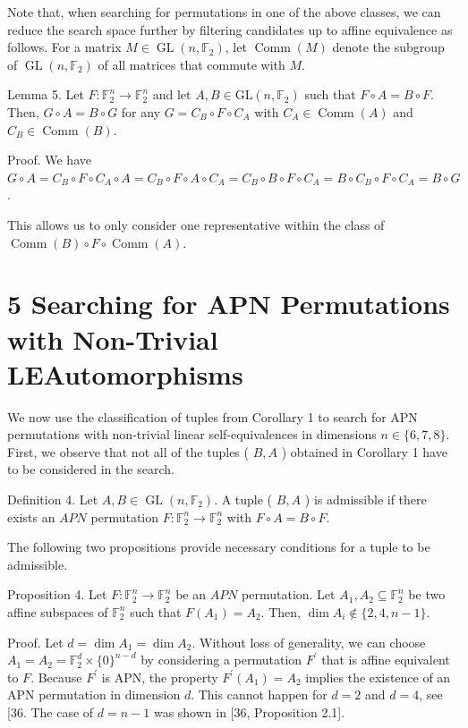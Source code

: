 \documentclass[10pt]{article}
\begin{document}
Note that, when searching for permutations in one of the above classes, we can reduce the search space further by filtering candidates up to affine equivalence as follows. For a matrix $M \in \operatorname{GL}\left(n, \mathbb{F}_{2}\right)$, let $\operatorname{Comm}(M)$ denote the subgroup of $\operatorname{GL}\left(n, \mathbb{F}_{2}\right)$ of all matrices that commute with $M$.

Lemma 5. Let $F: \mathbb{F}_{2}^{n} \rightarrow \mathbb{F}_{2}^{n}$ and let $A, B \in \mathrm{GL}\left(n, \mathbb{F}_{2}\right)$ such that $F \circ A=B \circ F$. Then, $G \circ A=B \circ G$ for any $G=C_{B} \circ F \circ C_{A}$ with $C_{A} \in \operatorname{Comm}(A)$ and $C_{B} \in \operatorname{Comm}(B)$.

Proof. We have $G \circ A=C_{B} \circ F \circ C_{A} \circ A=C_{B} \circ F \circ A \circ C_{A}=C_{B} \circ B \circ F \circ C_{A}= B \circ C_{B} \circ F \circ C_{A}=B \circ G$.

This allows us to only consider one representative within the class of $\operatorname{Comm}(B) \circ F \circ \operatorname{Comm}(A)$.

\section*{5 Searching for APN Permutations with Non-Trivial LEAutomorphisms}
We now use the classification of tuples from Corollary 1 to search for APN permutations with non-trivial linear self-equivalences in dimensions $n \in\{6,7,8\}$. First, we observe that not all of the tuples ( $B, A$ ) obtained in Corollary 1 have to be considered in the search.

Definition 4. Let $A, B \in \operatorname{GL}\left(n, \mathbb{F}_{2}\right)$. A tuple ( $B, A$ ) is admissible if there exists an $A P N$ permutation $F: \mathbb{F}_{2}^{n} \rightarrow \mathbb{F}_{2}^{n}$ with $F \circ A=B \circ F$.

The following two propositions provide necessary conditions for a tuple to be admissible.

Proposition 4. Let $F: \mathbb{F}_{2}^{n} \rightarrow \mathbb{F}_{2}^{n}$ be an $A P N$ permutation. Let $A_{1}, A_{2} \subseteq \mathbb{F}_{2}^{n}$ be two affine subspaces of $\mathbb{F}_{2}^{n}$ such that $F\left(A_{1}\right)=A_{2}$. Then, $\operatorname{dim} A_{i} \notin\{2,4, n-1\}$.

Proof. Let $d=\operatorname{dim} A_{1}=\operatorname{dim} A_{2}$. Without loss of generality, we can choose $A_{1}=A_{2}= \mathbb{F}_{2}^{d} \times\{0\}^{n-d}$ by considering a permutation $F^{\prime}$ that is affine equivalent to $F$. Because $F^{\prime}$ is APN, the property $F^{\prime}\left(A_{1}\right)=A_{2}$ implies the existence of an APN permutation in dimension $d$. This cannot happen for $d=2$ and $d=4$, see [36. The case of $d=n-1$ was shown in [36, Proposition 2.1].
\end{document}
